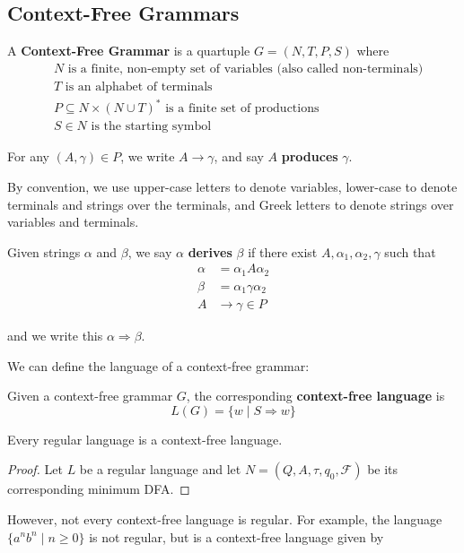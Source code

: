 \subsection{Context-Free Grammars}\label{subsec:context-free-grammars}
\begin{definition}
    A \textbf{Context-Free Grammar} is a quartuple \(G=(N, T, P, S)\) where 
          \begin{align*}
                & N\text{ is a finite, non-empty set of variables (also called non-terminals)}\\
                & T\text{ is an alphabet of terminals}\\
                & P\subseteq N\times{(N\cup T)}^*\text{ is a finite set of productions}\\
                & S\in N\text{ is the starting symbol}
          \end{align*}

          For any \((A, \gamma)\in P\), we write \(A\to\gamma \), and say \(A\) \textbf{produces} \(\gamma \). 
\end{definition}

By convention, we use upper-case letters to denote variables, lower-case to denote terminals and strings over the terminals, and Greek letters to denote strings over variables and terminals.

\begin{definition}
    Given strings \(\alpha \) and \(\beta \), we say \(\alpha \) \textbf{derives} \(\beta \) if there exist \(A, \alpha_1,\alpha_2,\gamma \) such that 
    \begin{align*}
          \alpha &= \alpha_1A\alpha_2\\
          \beta  &= \alpha_1\gamma\alpha_2\\
          A&\to \gamma\in P
    \end{align*}

    and we write this \(\alpha\Rightarrow\beta \). 
\end{definition}

We can define the language of a context-free grammar:

\begin{definition}
      Given a context-free grammar \(G\), the corresponding \textbf{context-free language} is \[L(G)=\{w \mid S\Rightarrow w\} \]
\end{definition}

\begin{theorem}
      Every regular language is a context-free language. 
\end{theorem}

\begin{proof}
      Let \(L\) be a regular language and let \(N=(Q, A, \tau, q_0, \mathcal{F})\) be its corresponding minimum DFA\@. 
\end{proof}

However, not every context-free language is regular. For example, the language \( \{a^n b^n \mid n\geq0\} \) is not regular, but is a context-free language given by